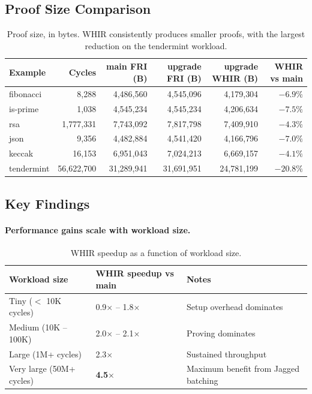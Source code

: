 \subsection{Proof Size Comparison}

\begin{table}[h]
\centering
\small
\begin{tabular}{lrrrrr}
\toprule
\textbf{Example} & \textbf{Cycles} & \textbf{main FRI (B)} & \textbf{upgrade FRI (B)} & \textbf{upgrade WHIR (B)} & \textbf{WHIR vs main} \\
\midrule
fibonacci   & 8{,}288        & 4{,}486{,}560  & 4{,}545{,}096  & 4{,}179{,}304  & \textbf{$-6.9\%$} \\
is-prime    & 1{,}038        & 4{,}545{,}234  & 4{,}545{,}234  & 4{,}206{,}634  & \textbf{$-7.5\%$} \\
rsa         & 1{,}777{,}331  & 7{,}743{,}092  & 7{,}817{,}798  & 7{,}409{,}910  & \textbf{$-4.3\%$} \\
json        & 9{,}356        & 4{,}482{,}884  & 4{,}541{,}420  & 4{,}166{,}796  & \textbf{$-7.0\%$} \\
keccak      & 16{,}153       & 6{,}951{,}043  & 7{,}024{,}213  & 6{,}669{,}157  & \textbf{$-4.1\%$} \\
tendermint  & 56{,}622{,}700 & 31{,}289{,}941 & 31{,}691{,}951 & 24{,}781{,}199 & \textbf{$-20.8\%$} \\
\bottomrule
\end{tabular}
\caption{Proof size, in bytes. WHIR consistently produces smaller proofs,
with the largest reduction on the tendermint workload.}
\label{tab:proof-size}
\end{table}

\subsection{Key Findings}

\paragraph{Performance gains scale with workload size.}

\begin{table}[h]
\centering
\begin{tabular}{lll}
\toprule
\textbf{Workload size} & \textbf{WHIR speedup vs main} & \textbf{Notes} \\
\midrule
Tiny ($<$ 10K cycles)     & 0.9$\times$ -- 1.8$\times$ & Setup overhead dominates \\
Medium (10K -- 100K)      & 2.0$\times$ -- 2.1$\times$ & Proving dominates \\
Large (1M+ cycles)        & 2.3$\times$                 & Sustained throughput \\
Very large (50M+ cycles)  & \textbf{4.5$\times$}        & Maximum benefit from Jagged batching \\
\bottomrule
\end{tabular}
\caption{WHIR speedup as a function of workload size.}
\label{tab:scale}
\end{table}

